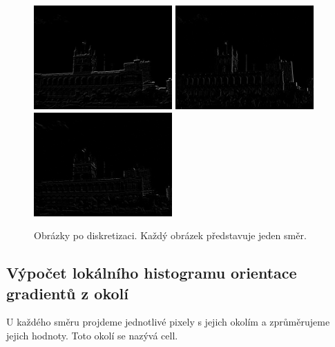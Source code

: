 \documentclass{report}
\begin{document}
\begin{figure}[H]
	\centering
	\includegraphics[width=150pt]{./img/directional0.jpg}
	\includegraphics[width=150pt]{./img/directional1.jpg}
	\includegraphics[width=150pt]{./img/directional2.jpg}
	\caption{Obrázky po diskretizaci. Každý obrázek představuje jeden směr.}
\end{figure}


\subsection{Výpočet lokálního histogramu orientace gradientů z okolí}
U každého směru projdeme jednotlivé pixely s jejich okolím a zprůměrujeme jejich hodnoty. Toto okolí se nazývá cell. \\
\end{document}
